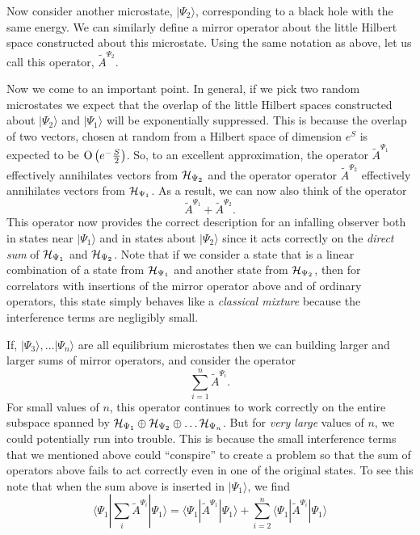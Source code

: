 \documentclass[12pt]{article}
\newcommand{\cop}[1]{#1}
\newcommand{\al}{\cop{A}} %
\def\tal{\widetilde{\al}} %
\def\hilb[#1]{{\cal H}_{#1}}
\def\Or[#1]{{\text{O}}\left({#1}\right)}
\newcommand{\be}{\begin{equation}}
\newcommand{\ee}{\end{equation}}
\begin{document}
Now consider another microstate, $|\Psi_2 \rangle$, corresponding to a black hole with the same energy. We can similarly define a mirror operator about the little Hilbert space constructed about this microstate. Using the same notation as above,  let us call this operator, $\tal^{\Psi_2}$.

Now we come to an important point. In general, if we pick two random microstates we expect that the overlap of the little Hilbert spaces constructed about $|\Psi_2 \rangle$ and $|\Psi_1 \rangle$ will be exponentially suppressed. This is because the overlap of two vectors, chosen at random from a Hilbert space of dimension $e^{S}$ is expected to be $\Or[e^{-{S\over 2}}]$.  So, to an excellent approximation, the operator $\tal^{\Psi_1}$ effectively annihilates  vectors from $\hilb[\Psi_2]$ and the operator  operator $\tal^{\Psi_2}$ effectively annihilates vectors from $\hilb[\Psi_1]$.  As a result,  we can now also think of the operator
\[
\tal^{\Psi_1} + \tal^{\Psi_2}.
\]
This operator now provides the correct description for an infalling observer both in states near $|\Psi_1 \rangle$ and in states about $|\Psi_2 \rangle$ since it acts correctly on the {\em direct sum} of $\hilb[\Psi_1]$ and $\hilb[\Psi_2]$.  Note that if we consider a state that is a linear combination of a state from $\hilb[\Psi_1]$ and another state from $\hilb[\Psi_2]$, then for correlators with insertions of the mirror operator above and of ordinary operators, this state simply behaves like a {\em classical mixture} because the interference terms are negligibly small. 

If, $|\Psi_3 \rangle, \ldots |\Psi_n \rangle$ are all equilibrium microstates then we can building larger and larger sums of mirror operators, and consider the operator
\[
\sum_{i=1}^n \tal^{\Psi_i}.
\]
For small values of $n$, this operator continues to work correctly on the entire subspace spanned by $\hilb[\Psi_1] \oplus \hilb[\Psi_2] \oplus \ldots \hilb[\Psi_n]$. But for {\em very large} values of $n$, we could potentially run into trouble. This is because the small interference terms that we mentioned above could ``conspire'' to create a problem so that the sum of operators above fails to act correctly even in one of the original states. To see this note that when the sum above is inserted in $|\Psi_1 \rangle$, we find
\be
\label{sumopinsertion}
\langle \Psi_{1} | \sum_i \tal^{\Psi_i} |\Psi_{1} \rangle
= \langle \Psi_1 | \tal^{\Psi_1} | \Psi_1 \rangle + \sum_{i=2}^n \langle \Psi_{1} |\tal^{\Psi_i} | \Psi_1 \rangle 
\ee 
\end{document}
